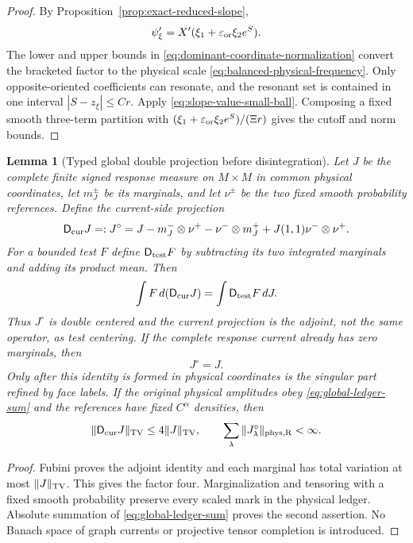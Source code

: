 \documentclass[11pt]{article}
\newtheorem{lemma}[theorem]{Lemma}
\begin{document}
\begin{proof}
By Proposition~\ref{prop:exact-reduced-slope},
\[
 \psi_\xi'=X'(\xi_1+\varepsilon_{\rm or}\xi_2e^S).
\]
The lower and upper bounds in
\eqref{eq:dominant-coordinate-normalization} convert the bracketed factor to
the physical scale \eqref{eq:balanced-physical-frequency}.  Only
opposite-oriented coefficients can resonate, and the resonant set is
contained in one interval $|S-z_\xi|\le Cr$.  Apply
\eqref{eq:slope-value-small-ball}.  Composing a fixed smooth three-term
partition with
$(\xi_1+\varepsilon_{\rm or}\xi_2e^S)/(\Xi r)$ gives the cutoff and norm
bounds.
\end{proof}
\begin{lemma}[Typed global double projection before disintegration]
\label{lem:global-label-recentering}
Let $J$ be the complete finite signed response measure on $M\times M$ in
common physical coordinates, let $m_J^\pm$ be its marginals, and let
$\nu^\pm$ be the two fixed smooth probability references.  Define the
current-side projection
\begin{equation}
\label{eq:labelwise-recentering}
 \mathsf D_{\rm cur}J=:J^\circ
 =J-m_J^-\otimes\nu^+-\nu^-\otimes m_J^+
   +J(1,1)\nu^-\otimes\nu^+.
\end{equation}
For a bounded test $F$ define $\mathsf D_{\rm test}F$ by subtracting its two
integrated marginals and adding its product mean.  Then
\[
 \int F\,d(\mathsf D_{\rm cur}J)=
 \int \mathsf D_{\rm test}F\,dJ.
\]
Thus $J^\circ$ is double centered and the current projection is the adjoint,
not the same operator, as test centering.  If the complete response current
already has zero marginals, then
\begin{equation}
\label{eq:global-recentering-sum}
 J^\circ=J.
\end{equation}
Only after this identity is formed in physical coordinates is the singular
part refined by face labels.  If the original physical amplitudes obey
\eqref{eq:global-ledger-sum} and the references have fixed $C^\alpha$
densities, then
\begin{equation}
\label{eq:recenter-norm-ledger}
 \|\mathsf D_{\rm cur}J\|_{\rm TV}
 \le4\|J\|_{\rm TV},\qquad
 \sum_\lambda\|J_\lambda^\circ\|_{\rm phys,R}<\infty .
\end{equation}
\end{lemma}

\begin{proof}
Fubini proves the adjoint identity and each marginal has total variation at
most $\|J\|_{\rm TV}$.  This gives the factor four.  Marginalization and
tensoring with a fixed smooth probability preserve every scaled mark in the
physical ledger.  Absolute summation of \eqref{eq:global-ledger-sum} proves
the second assertion.  No Banach space of graph currents or projective tensor
completion is introduced.
\end{proof}
\end{document}
